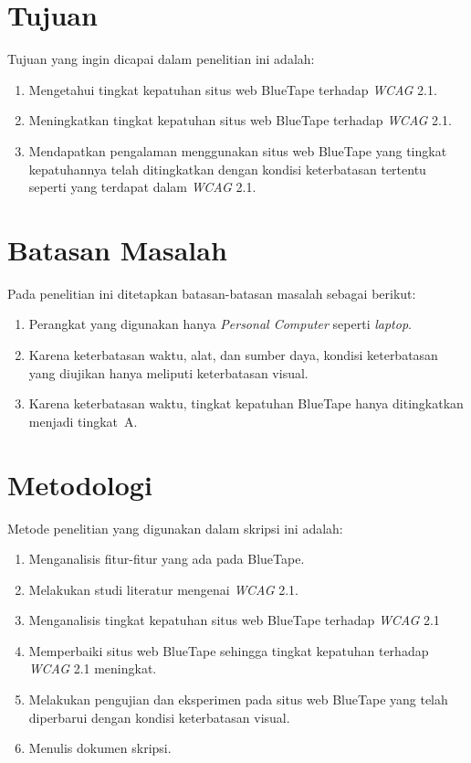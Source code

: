\section{Tujuan}
\label{sec:tujuan}
Tujuan yang ingin dicapai dalam penelitian ini adalah:
\begin{enumerate}
	\item Mengetahui tingkat kepatuhan situs web BlueTape terhadap \textit{WCAG} 2.1.
	\item Meningkatkan tingkat kepatuhan situs web BlueTape terhadap \textit{WCAG} 2.1.
	\item Mendapatkan pengalaman menggunakan situs web BlueTape yang tingkat kepatuhannya telah ditingkatkan dengan kondisi keterbatasan tertentu seperti yang terdapat dalam \textit{WCAG} 2.1.
\end{enumerate}

\section{Batasan Masalah}
\label{sec:batasan}
Pada penelitian ini ditetapkan batasan-batasan masalah sebagai berikut:
\begin{enumerate}
	\item Perangkat yang digunakan hanya \textit{Personal Computer} seperti \textit{laptop}.
	\item Karena keterbatasan waktu, alat, dan sumber daya, kondisi keterbatasan yang diujikan hanya meliputi keterbatasan visual.
	\item Karena keterbatasan waktu, tingkat kepatuhan BlueTape hanya ditingkatkan menjadi \mbox{tingkat A}.
\end{enumerate}

\section{Metodologi}
\label{sec:metlit}
Metode penelitian yang digunakan dalam skripsi ini adalah:
\begin{enumerate}
	\item Menganalisis fitur-fitur yang ada pada BlueTape.
	\item Melakukan studi literatur mengenai \textit{WCAG} 2.1.
	\item Menganalisis tingkat kepatuhan situs web BlueTape terhadap \textit{WCAG} 2.1
	\item Memperbaiki situs web BlueTape sehingga tingkat kepatuhan terhadap \textit{WCAG} 2.1 meningkat.
	\item Melakukan pengujian dan eksperimen pada situs web BlueTape yang telah diperbarui dengan kondisi keterbatasan visual.
	\item Menulis dokumen skripsi.
\end{enumerate}

